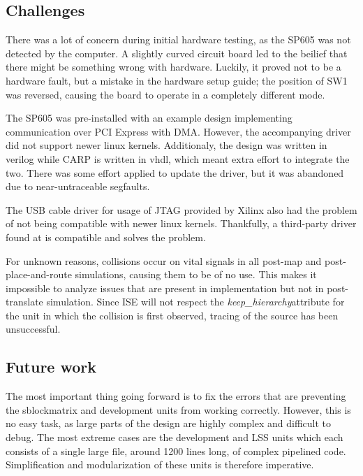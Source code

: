
\subsection{Challenges}
\label{sec:challenges}

There was a lot of concern during initial hardware testing, as the SP605 was not detected by the computer.
A slightly curved circuit board led to the beilief that there might be something wrong with hardware.
Luckily, it proved not to be a hardware fault, but a mistake in the hardware setup guide; the position of SW1 was reversed, causing the board to operate in a completely different mode.

The SP605 was pre-installed with an example design implementing communication over PCI Express with DMA.
However, the accompanying driver did not support newer linux kernels.
Additionaly, the design was written in verilog while CARP is written in vhdl, which meant extra effort to integrate the two.
There was some effort applied to update the driver, but it was abandoned due to near-untraceable segfaults.

The USB cable driver for usage of JTAG provided by Xilinx also had the problem of not being compatible with newer linux kernels.
Thankfully, a third-party driver found at \cite{usbdriver} is compatible and solves the problem.

For unknown reasons, collisions occur on vital signals in all post-map and post-place-and-route simulations\footnotemark, causing them to be of no use.
This makes it impossible to analyze issues that are present in implementation but not in post-translate simulation.
Since ISE will not respect the \emph{keep\_hierarchy}\footnotemark attribute for the unit in which the collision is first observed, tracing of the source has been unsuccessful.

\subsection{Future work}

The most important thing going forward is to fix the errors that are preventing the sblockmatrix and development units from working correctly.
However, this is no easy task, as large parts of the design are highly complex and difficult to debug.
The most extreme cases are the development and LSS units which each consists of a single large file, around 1200 lines long, of complex pipelined code.
Simplification and modularization of these units is therefore imperative.

